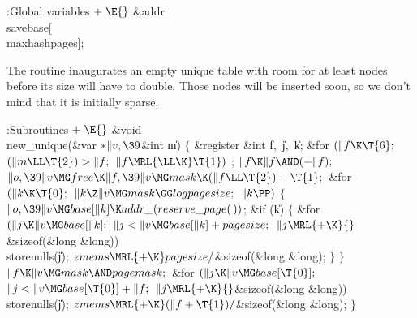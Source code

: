 \B{}:Global variables\X${}\mathrel+\E{}$\6
\&{addr} \\{savebase}[\\{maxhashpages}];\par
\fi

The  routine inaugurates an empty unique table with
room for
at least  nodes before its size will have to double.
Those nodes will be inserted soon, so we don't mind
that it is initially sparse.

\Y\B\4:Subroutines\X${}\mathrel+\E{}$\6
\&{void} \\{new\_unique}(\&{var} ${}{*}\|v,\39{}$\&{int} \|m)\1\1\2\2\6
${}\{{}$\1\6
\&{register} \&{int} \|f${},{}$ \|j${},{}$ \|k;\7
\&{for} ${}(\|f\K\T{6};{}$ ${}(\|m\LL\T{2})>\|f;{}$ ${}\|f\MRL{{\LL}{\K}}%
\T{1}){}$\1\5
;\2\6
${}\|f\K\|f\AND({-}\|f);{}$\6
${}\|o,\39\|v\MG\\{free}\K\|f,\39\|v\MG\\{mask}\K(\|f\LL\T{2})-\T{1};{}$\6
\&{for} ${}(\|k\K\T{0};{}$ ${}\|k\Z\|v\MG\\{mask}\GG\\{logpagesize};{}$ ${}\|k%
\PP){}$\5
${}\{{}$\1\6
${}\|o,\39\|v\MG\\{base}[\|k]\K\\{addr\_}(\\{reserve\_page}(\,)){}$;\6
\&{if} (\|k)\5
${}\{{}$\1\6
\&{for} ${}(\|j\K\|v\MG\\{base}[\|k];{}$ ${}\|j<\|v\MG\\{base}[\|k]+%
\\{pagesize};{}$ ${}\|j\MRL{+{\K}}{}$\&{sizeof}(\&{long} \&{long}))\1\5
\\{storenulls}(\|j);\2\6
${}\\{zmems}\MRL{+{\K}}\\{pagesize}/{}$\&{sizeof}(\&{long} \&{long});\6
\4${}\}{}$\2\6
\4${}\}{}$\2\6
${}\|f\K\|v\MG\\{mask}\AND\\{pagemask};{}$\6
\&{for} ${}(\|j\K\|v\MG\\{base}[\T{0}];{}$ ${}\|j<\|v\MG\\{base}[\T{0}]+\|f;{}$
${}\|j\MRL{+{\K}}{}$\&{sizeof}(\&{long} \&{long}))\1\5
\\{storenulls}(\|j);\2\6
${}\\{zmems}\MRL{+{\K}}(\|f+\T{1})/{}$\&{sizeof}(\&{long} \&{long});\6
\4${}\}{}$\2\par
\fi

